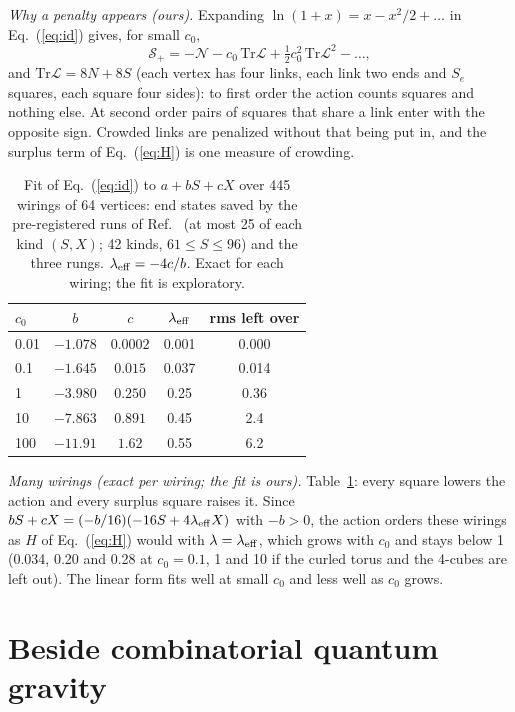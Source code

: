 \documentclass[pre,twocolumn,superscriptaddress,nofootinbib]{revtex4-2}
\begin{document}
\emph{Why a penalty appears (ours).} Expanding $\ln(1+x)=x-x^2/2+\dots$ in Eq.~(\ref{eq:id}) gives, for small $c_0$,
\begin{equation}
\mathcal{S}_{+}=-\mathcal{N}-c_0\,\mathrm{Tr}\boldsymbol{\mathcal{L}}
+\tfrac12c_0^2\,\mathrm{Tr}\boldsymbol{\mathcal{L}}^2-\dots,
\end{equation}
and $\mathrm{Tr}\boldsymbol{\mathcal{L}}=8N+8S$ (each vertex has four links, each link two ends and $S_e$ squares,
each square four sides): to first order the action counts squares and nothing else. At second order pairs of
squares that share a link enter with the opposite sign. Crowded links are penalized without that being put in, and
the surplus term of Eq.~(\ref{eq:H}) is one measure of crowding.

\begin{table}[t]
\caption{Fit of Eq.~(\ref{eq:id}) to $a+bS+cX$ over 445 wirings of 64 vertices: end states saved by the
pre-registered runs of Ref.~\cite{paper1} (at most 25 of each kind $(S,X)$; 42 kinds, $61\le S\le96$) and the three
rungs. $\lambda_{\rm eff}=-4c/b$. Exact for each wiring; the fit is exploratory.}
\label{tab:fit}
\begin{ruledtabular}
\begin{tabular}{lcccc}
$c_0$ & $b$ & $c$ & $\lambda_{\rm eff}$ & rms left over \\
\hline
0.01 & $-1.078$ & $0.0002$ & 0.001 & 0.000 \\
0.1 & $-1.645$ & $0.015$ & 0.037 & 0.014 \\
1 & $-3.980$ & $0.250$ & 0.25 & 0.36 \\
10 & $-7.863$ & $0.891$ & 0.45 & 2.4 \\
100 & $-11.91$ & $1.62$ & 0.55 & 6.2 \\
\end{tabular}
\end{ruledtabular}
\end{table}

\emph{Many wirings (exact per wiring; the fit is ours).} Table~\ref{tab:fit}: every square lowers the action and
every surplus square raises it. Since $bS+cX=(-b/16)(-16S+4\lambda_{\rm eff}X)$ with $-b>0$, the action orders these
wirings as $H$ of Eq.~(\ref{eq:H}) would with $\lambda=\lambda_{\rm eff}$, which grows with $c_0$ and stays below 1
(0.034, 0.20 and 0.28 at $c_0=0.1$, 1 and 10 if the curled torus and the 4-cubes are left out). The linear form fits
well at small $c_0$ and less well as $c_0$ grows.

\section{Beside combinatorial quantum gravity}
\end{document}

